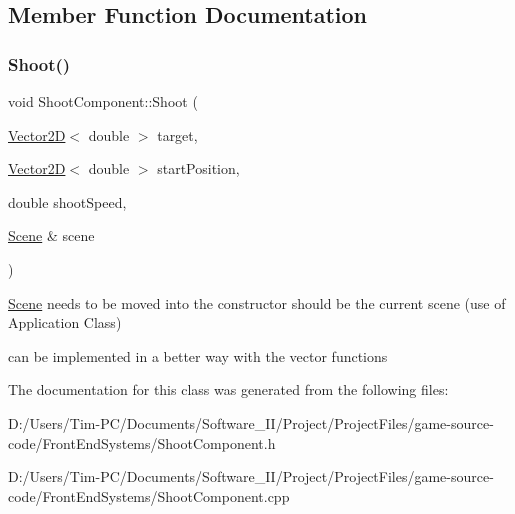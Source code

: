 \subsection{Member Function Documentation}
\mbox{\label{class_shoot_component_a27a553ba952e96c77bc6e7d2e5ca9f0a}} 
\subsubsection{\texorpdfstring{Shoot()}{Shoot()}}
{\footnotesize\ttfamily void Shoot\+Component\+::\+Shoot (\begin{DoxyParamCaption}\item[{\hyperlink{class_vector2_d}{Vector2D}$<$ double $>$}]{target,  }\item[{\hyperlink{class_vector2_d}{Vector2D}$<$ double $>$}]{start\+Position,  }\item[{double}]{shoot\+Speed,  }\item[{\hyperlink{class_scene}{Scene} \&}]{scene }\end{DoxyParamCaption})}



\hyperlink{class_scene}{Scene} needs to be moved into the constructor should be the current scene (use of Application Class) 

can be implemented in a better way with the vector functions 

The documentation for this class was generated from the following files\+:\begin{DoxyCompactItemize}
\item 
D\+:/\+Users/\+Tim-\/\+P\+C/\+Documents/\+Software\+\_\+\+I\+I/\+Project/\+Project\+Files/game-\/source-\/code/\+Front\+End\+Systems/Shoot\+Component.\+h\item 
D\+:/\+Users/\+Tim-\/\+P\+C/\+Documents/\+Software\+\_\+\+I\+I/\+Project/\+Project\+Files/game-\/source-\/code/\+Front\+End\+Systems/Shoot\+Component.\+cpp\end{DoxyCompactItemize}
